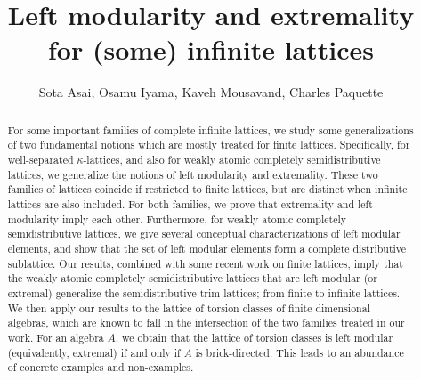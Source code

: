 \documentclass{amsart}
\theoremstyle{thmstyle}
\theoremstyle{exstyle}
\theoremstyle{defstyle}
\theoremstyle{remstyle}
\theoremstyle{remstyle}
\begin{document}
\title[Left modularity and extremality for infinite lattices]{Left modularity and extremality for (some) infinite lattices}

\author[Sota Asai, Osamu Iyama, Kaveh Mousavand, Charles Paquette]{Sota Asai, Osamu Iyama, Kaveh Mousavand, Charles Paquette} 

\address{Sota Asai: Graduate School of Mathematical Sciences, the University of Tokyo, Japan}
\address{Osamu Iyama: Graduate School of Mathematical Sciences, the University of Tokyo, Japan}
\address{Kaveh Mousavand: Representation Theory and Algebraic Combinatorics Unit, Okinawa Institute of Science and Technology (OIST), Japan}
\address{Charles Paquette: Department of Mathematics and Computer Science, Royal Military College of Canada, Kingston ON, Canada}



\begin{abstract} 
For some important families of complete infinite lattices, we study some generalizations of two fundamental notions which are mostly treated for finite lattices. 
Specifically, for well-separated $\kappa$-lattices, and also for weakly atomic completely semidistributive lattices, we generalize the notions of left modularity and extremality. 
These two families of lattices coincide if restricted to finite lattices, but are distinct when infinite lattices are also included. 
For both families, we prove that extremality and left modularity imply each other. 
Furthermore, for weakly atomic completely semidistributive lattices, we give several conceptual characterizations of left modular elements, and show that the set of left modular elements form a complete distributive sublattice. 
Our results, combined with some recent work on finite lattices, imply that the weakly atomic completely semidistributive lattices that are left modular (or extremal) generalize the semidistributive trim lattices; from finite to infinite lattices. 
We then apply our results to the lattice of torsion classes of finite dimensional algebras, which are known to fall in the intersection of the two families treated in our work. For an algebra $A$, we obtain that the lattice of torsion classes is left modular (equivalently, extremal) if and only if $A$ is brick-directed. This leads to an abundance of concrete examples and non-examples.
\end{abstract}
\end{document}
